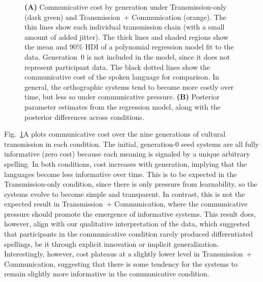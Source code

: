 \documentclass[doc,biblatex]{apa7}
\begin{document}
	\begin{figure}
	\vspace*{2pt}
	\caption{\textbf{(A)} Communicative cost by generation under Transmission-only (dark green) and Transmission~+ Communication (orange). The thin lines show each individual transmission chain (with a small amount of added jitter). The thick lines and shaded regions show the mean and 90\% HDI of a polynomial regression model fit to the data. Generation~0 is not included in the model, since it does not represent participant data. The black dotted lines show the communicative cost of the spoken language for comparison. In general, the orthographic systems tend to become more costly over time, but less so under communicative pressure. \textbf{(B)} Posterior parameter estimates from the regression model, along with the posterior differences across conditions.}
	\label{cost_dif}
	\end{figure}

Fig.~\ref{cost_dif}A plots communicative cost over the nine generations of cultural transmission in each condition. The initial, generation-0 seed systems are all fully informative (zero cost) because each meaning is signaled by a unique arbitrary spelling. In both conditions, cost increases with generation, implying that the languages become less informative over time. This is to be expected in the Transmission-only condition, since there is only pressure from learnability, so the systems evolve to become simple and transparent. In contrast, this is not the expected result in Transmission~+ Communication, where the communicative pressure should promote the emergence of informative systems. This result does, however, align with our qualitative interpretation of the data, which suggested that participants in the communicative condition rarely produced differentiated spellings, be it through explicit innovation or implicit generalization. Interestingly, however, cost plateaus at a slightly lower level in Transmission~+ Communication, suggesting that there is some tendency for the systems to remain slightly more informative in the communicative condition.
\end{document}
